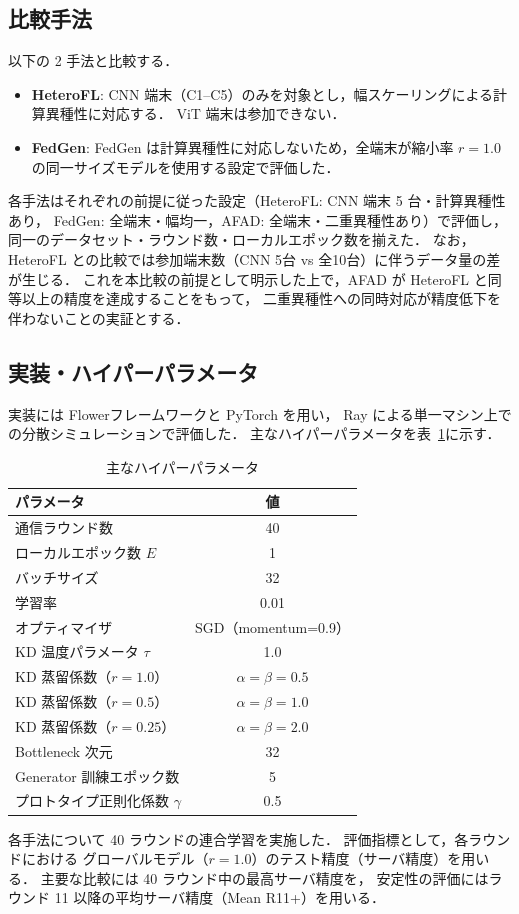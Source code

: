 \subsection{比較手法}

以下の 2 手法と比較する．

\begin{itemize}
  \item \textbf{HeteroFL}\cite{HeteroFL}:
        CNN 端末（C1–C5）のみを対象とし，幅スケーリングによる計算異種性に対応する．
        ViT 端末は参加できない．

  \item \textbf{FedGen}\cite{FedGen}:
        FedGen は計算異種性に対応しないため，全端末が縮小率 $r = 1.0$
        の同一サイズモデルを使用する設定で評価した．
\end{itemize}

各手法はそれぞれの前提に従った設定（HeteroFL: CNN 端末 5 台・計算異種性あり，
FedGen: 全端末・幅均一，AFAD: 全端末・二重異種性あり）で評価し，
同一のデータセット・ラウンド数・ローカルエポック数を揃えた．
なお，HeteroFL との比較では参加端末数（CNN 5台 vs 全10台）に伴うデータ量の差が生じる．
これを本比較の前提として明示した上で，AFAD が HeteroFL と同等以上の精度を達成することをもって，
二重異種性への同時対応が精度低下を伴わないことの実証とする．

\subsection{実装・ハイパーパラメータ}

実装には Flower\cite{Flower}フレームワークと PyTorch を用い，
Ray による単一マシン上での分散シミュレーションで評価した．
主なハイパーパラメータを表~\ref{tab:hyperparams}に示す．

\begin{table}[htb]
  \centering
  \caption{主なハイパーパラメータ}
  \label{tab:hyperparams}
  \begin{tabular}{lc}
    \toprule
    パラメータ & 値 \\
    \midrule
    通信ラウンド数 & 40 \\
    ローカルエポック数 $E$ & 1 \\
    バッチサイズ & 32 \\
    学習率 & 0.01 \\
    オプティマイザ & SGD（momentum=0.9）\\
    KD 温度パラメータ $\tau$ & 1.0 \\
    KD 蒸留係数（$r=1.0$）& $\alpha = \beta = 0.5$ \\
    KD 蒸留係数（$r=0.5$）& $\alpha = \beta = 1.0$ \\
    KD 蒸留係数（$r=0.25$）& $\alpha = \beta = 2.0$ \\
    Bottleneck 次元 & 32 \\
    Generator 訓練エポック数 & 5 \\
    プロトタイプ正則化係数 $\gamma$ & 0.5 \\
    \bottomrule
  \end{tabular}
\end{table}

各手法について 40 ラウンドの連合学習を実施した．
評価指標として，各ラウンドにおける
グローバルモデル（$r=1.0$）のテスト精度（サーバ精度）を用いる．
主要な比較には 40 ラウンド中の最高サーバ精度を，
安定性の評価にはラウンド 11 以降の平均サーバ精度（Mean R11+）を用いる．

